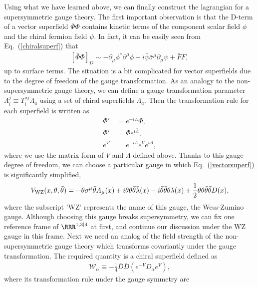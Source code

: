 \documentclass[12pt,twoside,book]{article}
\begin{document}
Using what we have learned above, we can finally construct the
lagrangian for a supersymmetric gauge theory.  The first important
observation is that the D-term of a vector superfield $\bar{\Phi}
\Phi$ contains kinetic terms of the component scalar field $\phi$ and
the chiral fermion field $\psi$.  In fact, it can be easily seen from
Eq.\ (\ref{chiralsuperf}) that
\begin{align}
 \left[ \bar{\Phi} \Phi \right]_D \sim -\partial_\mu \phi^{*}
 \partial^\mu \phi -i \bar{\psi} \bar{\sigma}^\mu \partial_\mu \psi +
 \bar{F}F,
\end{align}
up to surface terms.  The situation is a bit complicated for vector
superfields due to the degree of freedom of the gauge transformation.
As an analogy to the non-supersymmetric gauge theory, we can define a
gauge transformation parameter $\Lambda_i^j \equiv T^{aj}_i \Lambda_a$
using a set of chiral superfields $\Lambda_a$.  Then the
transformation rule for each superfield is written as
\begin{align}
 \Phi' &= e^{-i\Lambda} \Phi,\label{chiralsfgaugetransf} \\
 \bar{\Phi}' &= \bar{\Phi} e^{i\bar{\Lambda}},  \\
 e^{V'} &= e^{-i\bar{\Lambda}} e^V e^{i\Lambda},
 \label{vectorsfgaugetransf}
\end{align}
where we use the matrix form of $V$ and $\Lambda$ defined above.
Thanks to this gauge degree of freedom, we can choose a particular
gauge in which Eq.\ (\ref{vectorsuperf}) is significantly simplified,
\begin{align}
 V_{\rm WZ} (x,\theta,\bar{\theta}) = -\theta \sigma^\mu \bar{\theta}
 A_\mu(x) + i\theta\theta \bar{\theta} \bar{\lambda}(x) -
 i\bar{\theta} \bar{\theta} \theta \lambda(x) + \frac{1}{2}
 \theta\theta \bar{\theta} \bar{\theta} D(x),
\end{align}
where the subscript 'WZ' represents the name of this gauge, the
Wess-Zumino gauge.  Although choosing this gauge breaks supersymmetry,
we can fix one reference frame of $\RRR^{1,3|4}$ at first, and
continue our discussion under the WZ gauge in this frame.  Next we
need an analog of the field strength of the non-supersymmetric gauge
theory which transforms covariantly under the gauge transformation.
The required quantity is a chiral superfield defined as
\begin{align}
 \mathcal{W}_\alpha \equiv -\frac{1}{4} \bar{D} \bar{D} (e^{-V}
 D_\alpha e^V),
\end{align}
where its transformation rule under the gauge symmetry are
\end{document}
